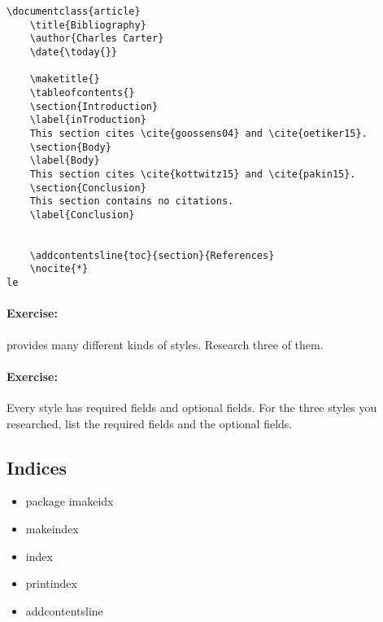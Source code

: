        \begin{verbatim}
\documentclass{article}
    \title{Bibliography}
    \author{Charles Carter}
    \date{\today{}}
 
    \maketitle{}
    \tableofcontents{}
    \section{Introduction}
    \label{inTroduction}
    This section cites \cite{goossens04} and \cite{oetiker15}.
    \section{Body}
    \label{Body}
    This section cites \cite{kottwitz15} and \cite{pakin15}.
    \section{Conclusion}
    This section contains no citations.
    \label{Conclusion}
        
    
    \addcontentsline{toc}{section}{References}
    \nocite{*}
le
        \end{verbatim}

        \paragraph{Exercise:} \bib provides many different kinds of styles. Research three of them.

        \paragraph{Exercise:} Every style has required fields and optional fields. For the three styles you researched, list the required fields and the optional fields.

    \subsection{Indices}
    \label{Indices}
        
        \begin{framed}
            \begin{itemize}
                \item{package imakeidx}
                \item{makeindex}
                \item{index}
                \item{printindex}
                \item{addcontentsline}
            \end{itemize}
        \end{framed}

